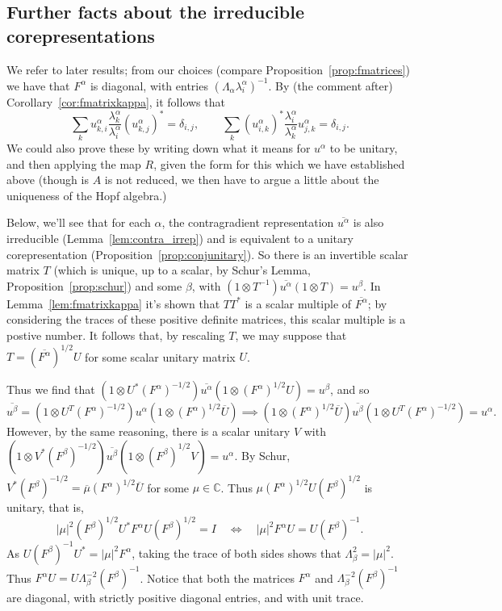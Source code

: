 \documentclass[twoside,a4paper,12pt]{article}
\theoremstyle{plain}
\theoremstyle{definition}
\begin{document}
\subsection{Further facts about the irreducible corepresentations}

We refer to later results; from our choices (compare
Proposition~\ref{prop:fmatrices}) we have that $F^\alpha$ is diagonal,
with entries $(\Lambda_\alpha \lambda^\alpha_i)^{-1}$.
By (the comment after) Corollary~\ref{cor:fmatrixkappa}, it follows that
\[ \sum_k u^\alpha_{k,i} \frac{\lambda^\alpha_k}{\lambda^\alpha_i}
(u^\alpha_{k,j})^* = \delta_{i,j}, \qquad
\sum_k (u^\alpha_{i,k})^* \frac{\lambda^\alpha_i}{\lambda^\alpha_k}
u^\alpha_{j,k} = \delta_{i,j}. \]
We could also prove these by writing down what it means for $u^\alpha$ to
be unitary, and then applying the map $R$, given the form for this which
we have established above (though is $A$ is not reduced, we then have to
argue a little about the uniqueness of the Hopf algebra.)

Below, we'll see that for each $\alpha$, the contragradient representation
$\overline{u^\alpha}$ is also irreducible (Lemma~\ref{lem:contra_irrep})
and is equivalent to a unitary corepresentation
(Proposition~\ref{prop:conjunitary}).  So there is an invertible scalar
matrix $T$ (which is unique, up to a scalar, by Schur's Lemma,
Proposition~\ref{prop:schur}) and some $\beta$, with
$(1\otimes T^{-1}) \overline{u^\alpha} (1\otimes T) = u^\beta$.
In Lemma~\ref{lem:fmatrixkappa} it's shown that
$TT^*$ is a scalar multiple of $\overline{F^\alpha}$; by considering the traces
of these positive definite matrices, this scalar multiple is a postive number.
It follows that, by rescaling $T$, we may suppose that
$T = (\overline{F^\alpha})^{1/2} U$ for some scalar unitary matrix $U$.

Thus we find that $(1 \otimes U^* (F^\alpha)^{-1/2}) \overline{u^\alpha}
(1\otimes (F^\alpha)^{1/2}U) = u^\beta$, and so
\[ \overline{u^\beta} = (1\otimes U^T (F^\alpha)^{-1/2}) u^\alpha
(1\otimes (F^\alpha)^{1/2} \overline{U})
\implies
(1\otimes (F^\alpha)^{1/2} \overline{U}) \overline{u^\beta}
(1\otimes U^T (F^\alpha)^{-1/2}) = u^\alpha. \]
However, by the same reasoning, there is a scalar unitary $V$ with
$(1 \otimes V^* (F^\beta)^{-1/2}) \overline{u^\beta}
(1\otimes (F^\beta)^{1/2}V) = u^\alpha$.  By Schur, $V^* (F^\beta)^{-1/2}
= \overline{\mu} (F^\alpha)^{1/2} \overline{U}$ for some $\mu\in\mathbb C$.
Thus $\mu (F^\alpha)^{1/2} U (F^\beta)^{1/2}$ is unitary, that is,
\[ |\mu|^2 (F^\beta)^{1/2} U^* F^\alpha U (F^\beta)^{1/2} = I
\quad\Leftrightarrow\quad
|\mu|^2 F^\alpha U = U (F^\beta)^{-1}. \]
As $U (F^\beta)^{-1} U^* = |\mu|^2 F^\alpha$, taking the trace of
both sides shows that $\Lambda_\beta^2 = |\mu|^2$.
Thus $F^\alpha U = U \Lambda_\beta^{-2} (F^\beta)^{-1}$.  Notice that
both the matrices $F^\alpha$ and $\Lambda_\beta^{-2} (F^\beta)^{-1}$
are diagonal, with strictly positive diagonal entries, and with unit trace.
\end{document}
